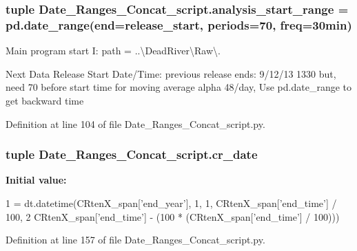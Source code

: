 \subsubsection[{analysis\+\_\+start\+\_\+range}]{\setlength{\rightskip}{0pt plus 5cm}tuple Date\+\_\+\+Ranges\+\_\+\+Concat\+\_\+script.\+analysis\+\_\+start\+\_\+range = pd.\+date\+\_\+range(end={\bf release\+\_\+start}, periods=70, freq=\textquotesingle{}30min\textquotesingle{})}\label{namespace_date___ranges___concat__script_a0afaa5d03f9354ea68b7437702c1ceb0}


Main program start I\+: path = \textquotesingle{}..\textbackslash{}Dead\+River\textbackslash{}Raw\textbackslash{}\textquotesingle{}. 

Next Data Release Start Date/\+Time\+: previous release ends\+: 9/12/13 1330 but, need 70 before start time for moving average alpha 48/day, Use pd.\+date\+\_\+range to get backward time 

Definition at line 104 of file Date\+\_\+\+Ranges\+\_\+\+Concat\+\_\+script.\+py.

\hypertarget{namespace_date___ranges___concat__script_a7c53ccead2ad1f6ae8d72f94e8742a5f}{}
\subsubsection[{cr\+\_\+date}]{\setlength{\rightskip}{0pt plus 5cm}tuple Date\+\_\+\+Ranges\+\_\+\+Concat\+\_\+script.\+cr\+\_\+date}\label{namespace_date___ranges___concat__script_a7c53ccead2ad1f6ae8d72f94e8742a5f}
{\bfseries Initial value\+:}
\begin{DoxyCode}
1 = dt.datetime(CRtenX\_span[\textcolor{stringliteral}{'end\_year'}], 1, 1, CRtenX\_span[\textcolor{stringliteral}{'end\_time'}] / 100,
2                                   CRtenX\_span[\textcolor{stringliteral}{'end\_time'}] - (100 * (CRtenX\_span[\textcolor{stringliteral}{'end\_time'}] / 100)))
\end{DoxyCode}


Definition at line 157 of file Date\+\_\+\+Ranges\+\_\+\+Concat\+\_\+script.\+py.

\hypertarget{namespace_date___ranges___concat__script_a75f2d0ae1ff003c8439ef1b27e325461}{}
